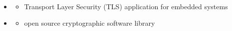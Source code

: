 \begin{frame}
\begin{columns}[t]
\begin{column}{0.625\textwidth}
\begin{itemize}
  \item  \small{\embtls}
  	\begin{itemize}
  		\item \small{Transport Layer Security (TLS) application for embedded
  		systems}
	\end{itemize}
  \item \small{\tomcrypt}
  	\begin{itemize}
  	  \item \small{open source cryptographic software library}
  	\end{itemize}
  
\end{itemize}

\end{column}

\end{columns}

\end{frame}


